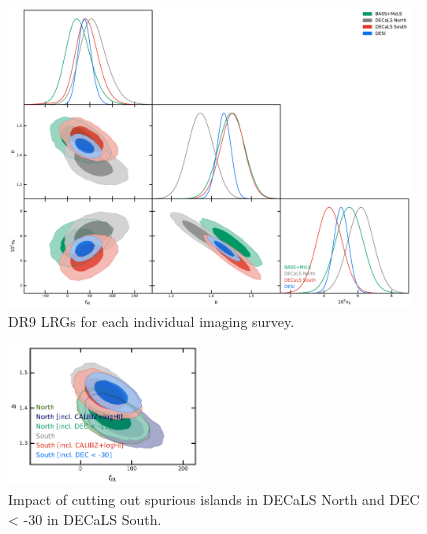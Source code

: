 \begin{figure}
    \centering
    \includegraphics[width=0.95\textwidth]{figures/mcmc_dr9regions.pdf} 
    \caption{DR9 LRGs for each individual imaging survey.}\label{fig:mcmc_dr9reg}
\end{figure}

\begin{figure}
    \centering
    \includegraphics[width=0.45\textwidth]{figures/mcmc_dr9_cutdec.pdf}     
    \caption{Impact of cutting out spurious islands in DECaLS North and DEC < -30 in DECaLS South.}\label{fig:mcmc_dr9cuts}
\end{figure}

